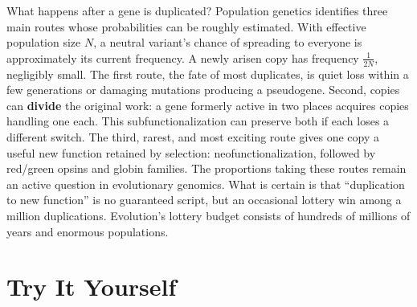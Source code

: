 \begin{tiaozhan}
What happens after a gene is duplicated? Population genetics identifies three main routes whose probabilities can be roughly estimated. With effective population size $N$, a neutral variant's chance of spreading to everyone is approximately its current frequency. A newly arisen copy has frequency $\frac{1}{2N}$, negligibly small. The first route, the fate of most duplicates, is quiet loss within a few generations or damaging mutations producing a pseudogene. Second, copies can \textbf{divide} the original work: a gene formerly active in two places acquires copies handling one each. This subfunctionalization can preserve both if each loses a different switch. The third, rarest, and most exciting route gives one copy a useful new function retained by selection: neofunctionalization, followed by red/green opsins and globin families. The proportions taking these routes remain an active question in evolutionary genomics. What is certain is that ``duplication to new function'' is no guaranteed script, but an occasional lottery win among a million duplications. Evolution's lottery budget consists of hundreds of millions of years and enormous populations.
\end{tiaozhan}

\section*{Try It Yourself}

